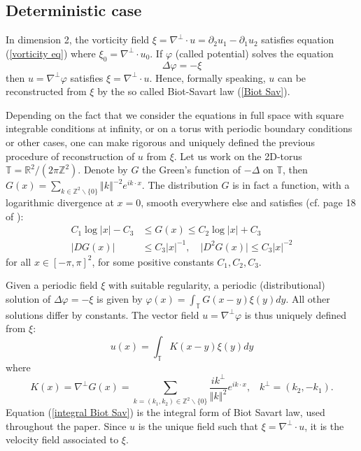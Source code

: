 \documentclass[11pt,a4paper]{article}%
\begin{document}
\subsection{Deterministic case}

In dimension 2, the vorticity field $\xi=\nabla^{\perp}\cdot u=\partial
_{2}u_{1}-\partial_{1}u_{2}$ satisfies equation (\ref{vorticity eq}) where
$\xi_{0}=\nabla^{\perp}\cdot u_{0}$. If $\varphi$ (called potential) solves
the equation
\[
\Delta\varphi=-\xi
\]
then $u=\nabla^{\perp}\varphi$ satisfies $\xi=\nabla^{\perp}\cdot u$. Hence,
formally speaking, $u$ can be reconstructed from $\xi$ by the so called
Biot-Savart law (\ref{Biot Sav}).

Depending on the fact that we consider the equations in full space with square
integrable conditions at infinity, or on a torus with periodic boundary
conditions or other cases, one can make rigorous and uniquely defined the
previous procedure of reconstruction of $u$ from $\xi$. Let us work on the
2D-torus $\mathbb{T}= \mathbb{R}^{2}/( 2\pi\mathbb{Z}^{2}) $. Denote by $G$
the Green's function of $-\Delta$ on $\mathbb{T}$, then
$G\left(  x\right)  =\sum_{k\in\mathbb{Z}^{2}\backslash\{0\}}\left\Vert k\right\Vert
^{-2}e^{ik\cdot x}$.
The distribution $G$ is in fact a function, with a logarithmic divergence at
$x=0$, smooth everywhere else and satisfies (cf.
page 18 of \cite{March Pulv}):
\begin{align*}
C_{1}\log\vert x\vert-C_{3}  &  \leq G( x) \leq C_{2}\log\vert x\vert
+C_{3}\quad\\
\vert DG( x) \vert &  \leq C_{3}\vert x\vert^{-1},\quad\vert D^{2}G( x)
\vert\leq C_{3}\vert x\vert^{-2}%
\end{align*}
for all $x\in[ -\pi,\pi] ^{2}$, for some positive constants $C_{1},C_{2}%
,C_{3}$.



Given a periodic field $\xi$ with suitable regularity, a periodic
(distributional) solution of $\Delta\varphi=-\xi$ is given by
$
\varphi\left(  x\right)  = \int_{\mathbb{T}}  G\left(  x-y\right)  \xi\left(
y\right)  dy
$.
All other solutions differ by constants. The vector field $u=\nabla^{\perp
}\varphi$ is thus uniquely defined from $\xi$:%
\begin{equation}
u\left(  x\right)  =\int_{\mathbb{T}} K\left(  x-y\right)  \xi\left(
y\right)  dy \label{integral Biot Sav}%
\end{equation}
where
\[
K( x) =\nabla^{\perp}G( x) = \sum_{k= (k_{1},k_{2})\in\mathbb{Z}^{2}\backslash\{0\}}\frac{i
k^{\perp}}{\left\Vert k\right\Vert ^{2}}e^{ik\cdot x},\;\;\;  k^{\perp}=
(k_{2}, -k_{1}).
\]
Equation (\ref{integral Biot Sav}) is the integral form of Biot Savart law,
used throughout the paper. Since $u$ is the unique field such that $\xi
=\nabla^{\perp}\cdot u$, it is the velocity field associated to $\xi$.
\end{document}
